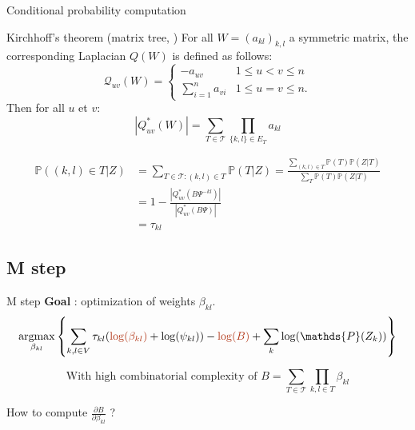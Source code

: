 \documentclass[9pt]{beamer}
\newcommand{\emphase}[1]{\textcolor{Complement}{#1}}
\newcommand{\argmax}{\mathop{\mathrm{argmax}}}
\begin{document}
\begin{frame}{Conditional probability computation}
\begin{exampleblock}{Kirchhoff's theorem (matrix tree, \cite{AiH89})}
For all $W=(a_{kl})_{k,l}$ a symmetric matrix, the corresponding Laplacian $Q(W)$ is defined as follows:
 \[\mathcal{Q}_{uv}(W)=
 \begin{cases}
     -a_{uv} & 1\leq u<v \leq n\\
    \sum_{i=1}^n a_{vi} & 1\leq u=v \leq n.
\end{cases}
\]
Then for all $u$ et $v$:
    \[ |Q^*_{uv}(W)|=\sum_{T\in\mathcal{T}} \prod_{\{k,l\}\in E_T} a_{kl} \]
\end{exampleblock}
\begin{align*}
  \mathds{P}((k,l)\in T | Z)&=\sum_{T\in \mathcal{T} : (k,l)\in T}\mathds{P}( T | Z) = \frac{\sum_{(k,l)\in T} \mathds{P}(T)\mathds{P}(Z|T)}{\sum_{T} \mathds{P}(T)\mathds{P}(Z|T)}\\
 &=1- \frac{|Q^*_{uv}(B\Psi^{-kl})|}{|Q^*_{uv}(B\Psi)|}\\
 &= \tau_{kl}
 \end{align*}
 
\end{frame}




\subsection{M step}
\begin{frame}{M step}
\textbf{Goal} : optimization of weights $\beta_{kl}$.\\
\vspace{1cm}
\[\argmax_{\beta_{kl}} \left\{\sum_{k,l\in V} \tau_{kl}(\emphase{\log(\beta_{kl})} + \log(\psi_{kl}) ) -\emphase{\log(B)} +\sum_k \log(\mathds{P}(Z_k))\right\}\]

  \vspace{1cm}
  
 \[\text{With high combinatorial complexity of } B = \sum_{T\in\mathcal{T}} \prod_{k,l\in T} \beta_{kl}\]
 
 \begin{center}
     How to compute \Large{$\frac{\partial B}{\partial\beta_{kl}}$ }?
 \end{center}
\end{frame}
\end{document}
